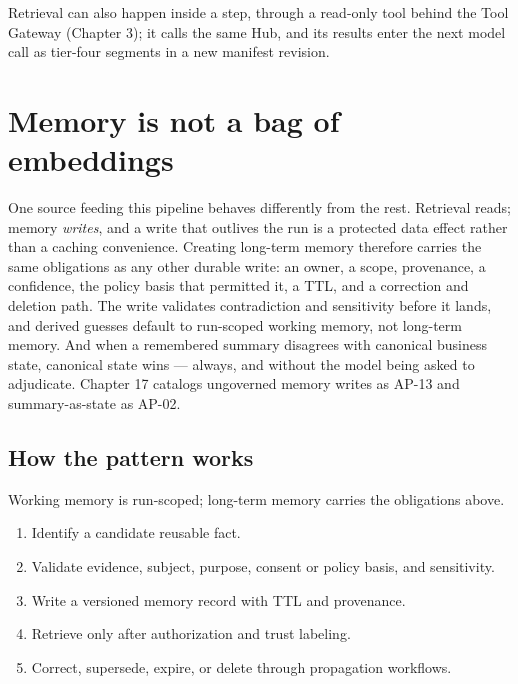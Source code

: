 Retrieval can also happen inside a step, through a read-only tool behind the Tool Gateway (Chapter 3); it calls the same Hub, and its results enter the next model call as tier-four segments in a new manifest revision.\par

\section{Memory is not a bag of embeddings}

One source feeding this pipeline behaves differently from the rest. Retrieval reads; memory \emph{writes}, and a write that outlives the run is a protected data effect rather than a caching convenience. Creating long-term memory therefore carries the same obligations as any other durable write: an owner, a scope, provenance, a confidence, the policy basis that permitted it, a TTL, and a correction and deletion path. The write validates contradiction and sensitivity before it lands, and derived guesses default to run-scoped working memory, not long-term memory. And when a remembered summary disagrees with canonical business state, canonical state wins — always, and without the model being asked to adjudicate. Chapter 17 catalogs ungoverned memory writes as AP-13 and summary-as-state as AP-02.\par

\subsection{How the pattern works}

Working memory is run-scoped; long-term memory carries the obligations above.\par

\begin{enumerate}

\item Identify a candidate reusable fact.

\item Validate evidence, subject, purpose, consent or policy basis, and sensitivity.

\item Write a versioned memory record with TTL and provenance.

\item Retrieve only after authorization and trust labeling.

\item Correct, supersede, expire, or delete through propagation workflows.

\end{enumerate}

